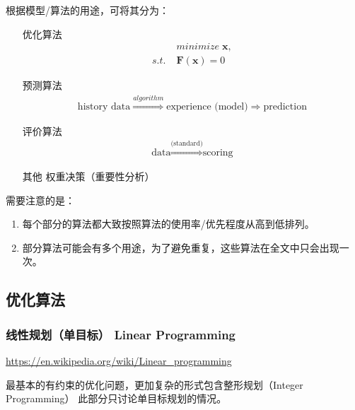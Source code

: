 \documentclass{article}
\begin{document}
根据模型/算法的用途，可将其分为：

\begin{itemize}
    \item[优化算法]
        \[\begin{split}
            &minimize\;\mathbf{x},\\
            s.t.\;&\mathbf{F}(\mathbf{x}) = 0
        \end{split}\]
    \item[预测算法]
        \[\begin{split}
            \text{history data} \stackrel{algorithm}{\Rightarrow} \text{experience (model)} \Rightarrow \text{prediction}
        \end{split}\]
    \item[评价算法]
        \[\begin{split}
            \text{data} \stackrel{\text{(standard)}}{\Rightarrow} \text{scoring}
        \end{split}\]
    \item[其他] 权重决策（重要性分析）
\end{itemize}

需要注意的是：
\begin{enumerate}
    \item 每个部分的算法都大致按照算法的使用率/优先程度从高到低排列。
    \item 部分算法可能会有多个用途，为了避免重复，这些算法在全文中只会出现一次。
\end{enumerate}

\subsection{优化算法}

\subsubsection{线性规划（单目标） Linear Programming}

\url{https://en.wikipedia.org/wiki/Linear_programming}

最基本的有约束的优化问题，更加复杂的形式包含整形规划（Integer Programming）
此部分只讨论单目标规划的情况。
\end{document}
